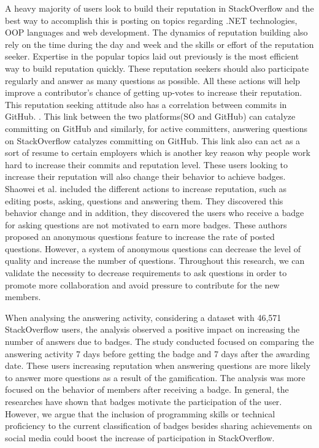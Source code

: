 \documentclass{sigchi}
\begin{document}
A heavy majority of users look to build their reputation in StackOverflow and the best way to accomplish this is posting on topics regarding .NET technologies, OOP languages and web development. \cite{Bosu} The dynamics of reputation building also rely on the time during the day and week and the skills or effort of the reputation seeker. Expertise in the popular topics laid out previously is the most efficient way to build reputation quickly. These reputation seekers should also participate regularly and answer as many questions as possible. All these actions will help improve a contributor's chance of getting up-votes to increase their reputation.  This reputation seeking attitude also has a correlation between commits in GitHub. \cite{Vasilescu}. This link between the two platforms(SO and GitHub) can catalyze committing on GitHub and similarly, for active committers, answering questions on StackOverflow catalyzes committing on GitHub. This link also can act as a sort of resume to certain employers which is another key reason why people work hard to increase their commits and reputation level. These users looking to increase their reputation will also change their behavior to achieve badges. \cite{Wang}  Shaowei et al. included the different actions to increase reputation, such as editing posts, asking, questions and answering them. They discovered this behavior change and in addition, they discovered the users who receive a badge for asking questions are not motivated to earn more badges. These authors proposed an anonymous questions feature to increase the rate of posted questions. However, a system of anonymous questions can decrease the level of quality and increase the number of questions. Throughout this research, we can validate the necessity to decrease requirements to ask questions in order to promote more collaboration and avoid pressure to contribute for the new members.

When analysing the answering activity, considering a dataset with 46,571 StackOverflow users,\cite{Cavusoglu} the analysis observed a positive impact on increasing the number of answers due to badges. The study conducted focused on comparing the answering activity 7 days before getting the badge and 7 days after the awarding date. These users increasing reputation when answering questions are more likely to answer more questions as a result of the gamification. The analysis was more focused on the behavior of members after receiving a badge. In general, the researches have shown that badges motivate the participation of the user. However, we argue that the inclusion of programming skills or technical proficiency to the current classification of badges besides sharing achievements on social media could boost the increase of participation in StackOverflow.
\end{document}
